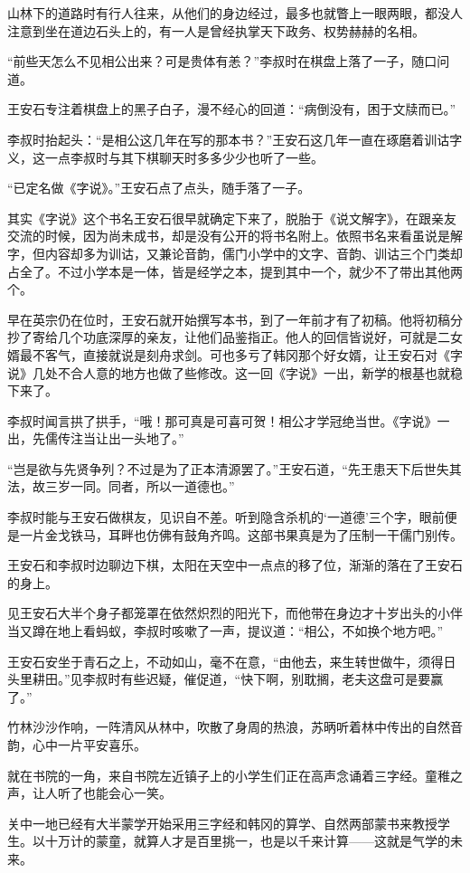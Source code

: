 山林下的道路时有行人往来，从他们的身边经过，最多也就瞥上一眼两眼，都没人注意到坐在道边石头上的，有一人是曾经执掌天下政务、权势赫赫的名相。

“前些天怎么不见相公出来？可是贵体有恙？”李叔时在棋盘上落了一子，随口问道。

王安石专注着棋盘上的黑子白子，漫不经心的回道：“病倒没有，困于文牍而已。”

李叔时抬起头：“是相公这几年在写的那本书？”王安石这几年一直在琢磨着训诂字义，这一点李叔时与其下棋聊天时多多少少也听了一些。

“已定名做《字说》。”王安石点了点头，随手落了一子。

其实《字说》这个书名王安石很早就确定下来了，脱胎于《说文解字》，在跟亲友交流的时候，因为尚未成书，却是没有公开的将书名附上。依照书名来看虽说是解字，但内容却多为训诂，又兼论音韵，儒门小学中的文字、音韵、训诂三个门类却占全了。不过小学本是一体，皆是经学之本，提到其中一个，就少不了带出其他两个。

早在英宗仍在位时，王安石就开始撰写本书，到了一年前才有了初稿。他将初稿分抄了寄给几个功底深厚的亲友，让他们品鉴指正。他人的回信皆说好，可就是二女婿最不客气，直接就说是刻舟求剑。可也多亏了韩冈那个好女婿，让王安石对《字说》几处不合人意的地方也做了些修改。这一回《字说》一出，新学的根基也就稳下来了。

李叔时闻言拱了拱手，“哦！那可真是可喜可贺！相公才学冠绝当世。《字说》一出，先儒传注当让出一头地了。”

“岂是欲与先贤争列？不过是为了正本清源罢了。”王安石道，“先王患天下后世失其法，故三岁一同。同者，所以一道德也。”

李叔时能与王安石做棋友，见识自不差。听到隐含杀机的‘一道德’三个字，眼前便是一片金戈铁马，耳畔也仿佛有鼓角齐鸣。这部书果真是为了压制一干儒门别传。

王安石和李叔时边聊边下棋，太阳在天空中一点点的移了位，渐渐的落在了王安石的身上。

见王安石大半个身子都笼罩在依然炽烈的阳光下，而他带在身边才十岁出头的小伴当又蹲在地上看蚂蚁，李叔时咳嗽了一声，提议道：“相公，不如换个地方吧。”

王安石安坐于青石之上，不动如山，毫不在意，“由他去，来生转世做牛，须得日头里耕田。”见李叔时有些迟疑，催促道，“快下啊，别耽搁，老夫这盘可是要赢了。”

竹林沙沙作响，一阵清风从林中，吹散了身周的热浪，苏昞听着林中传出的自然音韵，心中一片平安喜乐。

就在书院的一角，来自书院左近镇子上的小学生们正在高声念诵着三字经。童稚之声，让人听了也能会心一笑。

关中一地已经有大半蒙学开始采用三字经和韩冈的算学、自然两部蒙书来教授学生。以十万计的蒙童，就算人才是百里挑一，也是以千来计算——这就是气学的未来。

